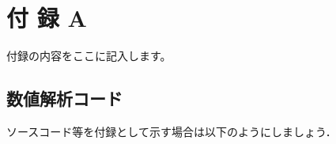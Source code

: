 \chapter*{付 録 A}
    付録の内容をここに記入します。
    
        \section{数値解析コード}
        ソースコード等を付録として示す場合は以下のようにしましょう．
        